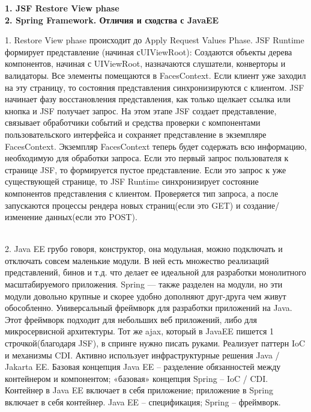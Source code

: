 \documentclass{article}
\newcommand{\bil}[4]{%
    \begin{minipage}{.3\textwidth}
        \textbf{1. #1} \\
        \textbf{2. #2}

        1. #3
        \\
        2. #4
    \end{minipage}
}
\begin{document}
\hfill
\bil{JSF Restore View phase}{Spring Framework. Отличия и сходства с JavaEE}{
    Restore View phase происходит до Apply Request Values Phase.
    JSF Runtime формирует представление (начиная сUIViewRoot): 
    Создаются объекты дерева компонентов, начиная с UIViewRoot, назначаются слушатели, конверторы и валидаторы. Все элементы помещаются в FacesContext. Если клиент уже заходил на эту страницу, то состояния представления синхронизируются с клиентом.
    JSF начинает фазу восстановления представления, как только щелкает ссылка или кнопка и JSF получает запрос. На этом этапе JSF создает представление, связывает обработчики событий и средства проверки с компонентами пользовательского интерфейса и сохраняет представление в экземпляре FacesContext. Экземпляр FacesContext теперь будет содержать всю информацию, необходимую для обработки запроса.
    Если это первый запрос пользователя к странице JSF, то формируется пустое представление.
    Если это запрос к уже существующей странице, то JSF Runtime синхронизирует состояние компонентов представления с клиентом.
    Проверяется тип запроса, а после запускаются процессы рендера новых страниц(если это GET) и создание/изменение данных(если это POST).
}{
    Java EE грубо говоря, конструктор, она модульная, можно подключать и отключать совсем маленькие модули. 
    В ней есть множество реализаций представлений, бинов и т.д. что делает ее идеальной для разработки монолитного масштабируемого приложения.
    Spring — также разделен на модули, но эти модули довольно крупные и скорее удобно дополняют друг-друга чем живут обособленно.
    Универсальный фреймворк для разработки приложений на Java.
    Этот фреймворк подходит для небольших веб приложений, либо для микросервисной архитектуры. Тот же ajax, который в JavaEE пишется 1 строчкой(благодаря JSF), в спринге нужно писать руками.
    Реализует паттерн IoC и механизмы CDI.
    Активно использует инфраструктурные решения Java / Jakarta EE.
    Базовая концепция Java EE – разделение обязанностей между контейнером и компонентом; «базовая» концепция Spring – IoC / CDI.
    Контейнер в Java EE включает в себя приложение; приложение в Spring включает в себя контейнер.
    Java EE – спецификация; Spring – фреймворк.
}
\\
\end{document}
